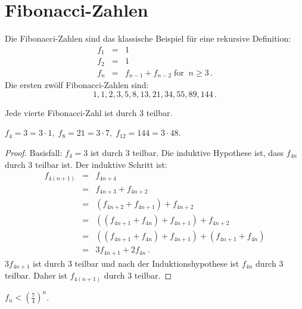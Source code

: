 
\section{Fibonacci-Zahlen}\label{s.induction-fibonacci}

Die Fibonacci-Zahlen sind das klassische Beispiel für eine rekursive Definition:
\begin{eqnarray*}
f_1 &=& 1\\
f_2 &=& 1\\
f_n &=& f_{n-1} + f_{n-2}\; \textrm{for} \;\; n \geq 3\,.
\end{eqnarray*}
Die ersten zwölf Fibonacci-Zahlen sind:
\[
1, 1, 2, 3, 5, 8, 13, 21, 34, 55, 89, 144\,.
\]
\begin{theorem}\label{thm.fib-div3}
Jede vierte Fibonacci-Zahl ist durch $3$ teilbar.
\end{theorem}

\begin{example}
$f_4=3=3\cdot 1,\; f_8=21=3\cdot 7,\; f_{12}=144=3\cdot 48$.
\end{example}

\begin{proof}
Basisfall: $f_4=3$ ist durch $3$ teilbar. Die induktive Hypothese ist, dass $f_{4n}$ durch $3$ teilbar ist. Der induktive Schritt ist:
\begin{eqnarray*}
f_{4(n+1)} &=& f_{4n+4}\\
&=& f_{4n+3}+f_{4n+2}\\
&=& (f_{4n+2}+f_{4n+1})+f_{4n+2}\\
&=& ((f_{4n+1}+f_{4n})+f_{4n+1})+f_{4n+2}\\
&=& ((f_{4n+1}+f_{4n})+f_{4n+1})+(f_{4n+1}+f_{4n})\\
&=& 3f_{4n+1}+2f_{4n}\,.
\end{eqnarray*}
$3f_{4n+1}$ ist durch $3$ teilbar und nach der Induktionshypothese ist $f_{4n}$ durch $3$ teilbar. Daher ist $f_{4(n+1)}$ durch $3$ teilbar.
\end{proof}

\begin{theorem}\label{thm.seven-fourths}
$f_n < \left(\displaystyle\frac{7}{4}\right)^n$.
\end{theorem}

